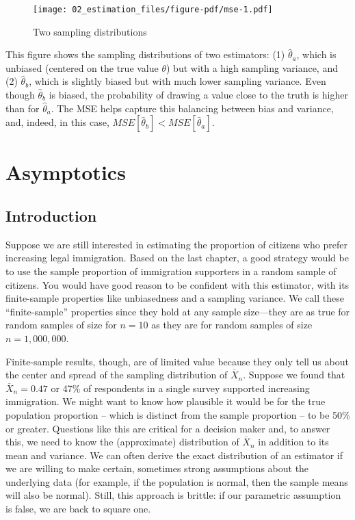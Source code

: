\documentclass[
  letterpaper,
  DIV=11,
  numbers=noendperiod]{scrreprt}
\newcommand{\Xbar}{\overline{X}}
\theoremstyle{plain}
\theoremstyle{definition}
\theoremstyle{definition}
\theoremstyle{remark}
\begin{document}
\begin{figure}

{\centering \texttt{[image: 02\_estimation\_files/figure-pdf/mse-1.pdf]}

}

\caption{Two sampling distributions}

\end{figure}

This figure shows the sampling distributions of two estimators: (1)
\(\widehat{\theta}_a\), which is unbiased (centered on the true value
\(\theta\)) but with a high sampling variance, and (2)
\(\widehat{\theta}_b\), which is slightly biased but with much lower
sampling variance. Even though \(\widehat{\theta}_b\) is biased, the
probability of drawing a value close to the truth is higher than for
\(\widehat{\theta}_a\). The MSE helps capture this balancing between
bias and variance, and, indeed, in this case,
\(MSE[\widehat{\theta}_b] < MSE[\widehat{\theta}_a]\).

\hypertarget{sec-asymptotics}{%
\chapter{Asymptotics}\label{sec-asymptotics}}

\hypertarget{introduction-3}{%
\section{Introduction}\label{introduction-3}}

Suppose we are still interested in estimating the proportion of citizens
who prefer increasing legal immigration. Based on the last chapter, a
good strategy would be to use the sample proportion of immigration
supporters in a random sample of citizens. You would have good reason to
be confident with this estimator, with its finite-sample properties like
unbiasedness and a sampling variance. We call these ``finite-sample''
properties since they hold at any sample size---they are as true for
random samples of size for \(n = 10\) as they are for random samples of
size \(n = 1,000,000\).

Finite-sample results, though, are of limited value because they only
tell us about the center and spread of the sampling distribution of
\(\Xbar_n\). Suppose we found that \(\Xbar_n = 0.47\) or 47\% of
respondents in a single survey supported increasing immigration. We
might want to know how plausible it would be for the true population
proportion -- which is distinct from the sample proportion -- to be 50\%
or greater. Questions like this are critical for a decision maker and,
to answer this, we need to know the (approximate) distribution of
\(\Xbar_n\) in addition to its mean and variance. We can often derive
the exact distribution of an estimator if we are willing to make
certain, sometimes strong assumptions about the underlying data (for
example, if the population is normal, then the sample means will also be
normal). Still, this approach is brittle: if our parametric assumption
is false, we are back to square one.
\end{document}
